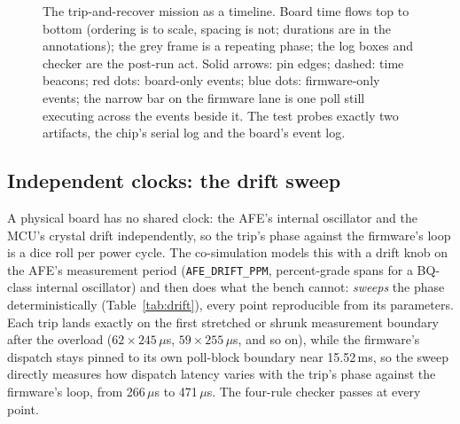 \documentclass[11pt]{article}
\begin{document}
\begin{figure}[p]
\caption{The trip-and-recover mission as a timeline.  Board time
flows top to bottom (ordering is to scale, spacing is not; durations
are in the annotations); the grey frame is a repeating phase; the
log boxes and checker are the post-run act.  Solid arrows: pin
edges; dashed: time beacons; red dots: board-only events; blue
dots: firmware-only events; the narrow bar on the firmware lane is
one poll still executing across the events beside it.  The test
probes exactly two artifacts,
the chip's serial log and the board's event log.}
\label{fig:flow}
\end{figure}

\subsection{Independent clocks: the drift sweep}
\label{sec:quantum}

A physical board has no shared clock: the AFE's internal
oscillator and the MCU's crystal drift independently, so the trip's
phase against the firmware's loop is a dice roll per power cycle.
The co-simulation models this with a drift knob on the AFE's
measurement period (\texttt{AFE\_DRIFT\_PPM}, percent-grade spans for
a BQ-class internal oscillator) and then does what the bench cannot:
\emph{sweeps} the phase deterministically
(Table~\ref{tab:drift}), every point reproducible from its
parameters.  Each trip lands exactly on the first stretched or
shrunk measurement boundary after the overload ($62 \times
245\,\mu$s, $59 \times 255\,\mu$s, and so on), while the firmware's
dispatch stays pinned to its own poll-block boundary near
15.52\,ms, so the sweep directly measures how dispatch latency
varies with the trip's phase against the firmware's loop, from
266\,$\mu$s to 471\,$\mu$s.  The four-rule checker passes at every
point.
\end{document}
